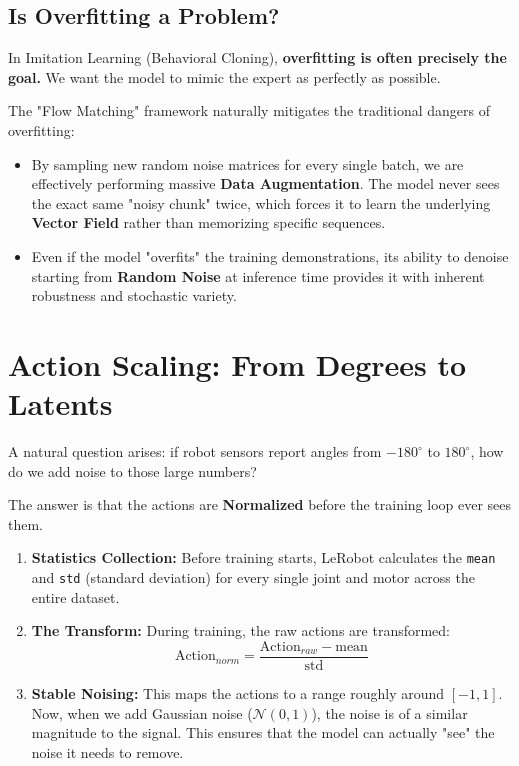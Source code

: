 \documentclass[11pt,a4paper]{article}
\begin{document}
\subsection{Is Overfitting a Problem?}
In Imitation Learning (Behavioral Cloning), \textbf{overfitting is often precisely the goal.} We want the model to mimic the expert as perfectly as possible. 

The "Flow Matching" framework naturally mitigates the traditional dangers of overfitting:
\begin{itemize}
    \item By sampling new random noise matrices for every single batch, we are effectively performing massive \textbf{Data Augmentation}. The model never sees the exact same "noisy chunk" twice, which forces it to learn the underlying \textbf{Vector Field} rather than memorizing specific sequences.
    \item Even if the model "overfits" the training demonstrations, its ability to denoise starting from \textbf{Random Noise} at inference time provides it with inherent robustness and stochastic variety.
\end{itemize}

\section{Action Scaling: From Degrees to Latents}
A natural question arises: if robot sensors report angles from $-180^\circ$ to $180^\circ$, how do we add noise to those large numbers?

The answer is that the actions are \textbf{Normalized} before the training loop ever sees them.
\begin{enumerate}
    \item \textbf{Statistics Collection:} Before training starts, LeRobot calculates the \texttt{mean} and \texttt{std} (standard deviation) for every single joint and motor across the entire dataset.
    \item \textbf{The Transform:} During training, the raw actions are transformed:
    \[ \text{Action}_{norm} = \frac{\text{Action}_{raw} - \text{mean}}{\text{std}} \]
    \item \textbf{Stable Noising:} This maps the actions to a range roughly around $[-1, 1]$. Now, when we add Gaussian noise ($\mathcal{N}(0, 1)$), the noise is of a similar magnitude to the signal. This ensures that the model can actually "see" the noise it needs to remove.
\end{enumerate}
\end{document}
